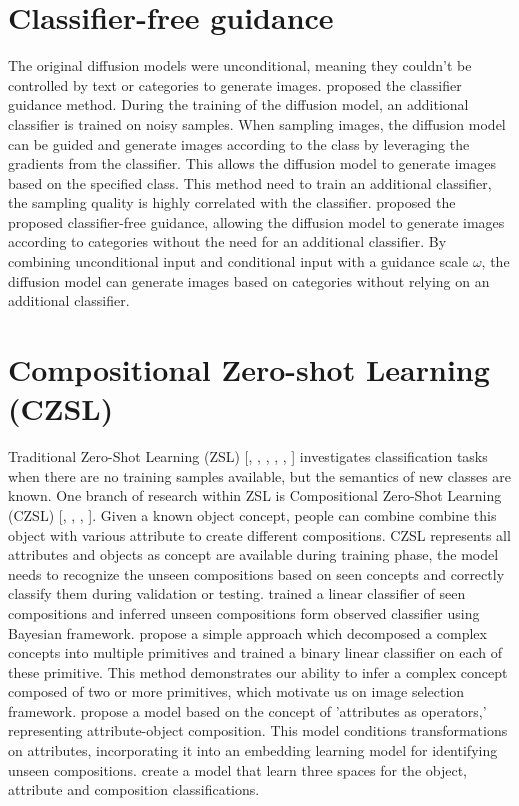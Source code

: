 \section{Classifier-free guidance}
The original diffusion models were unconditional, meaning they couldn't be controlled by text or categories to generate images.\cite{dhariwal2021diffusion} proposed the classifier guidance method. During the training of the diffusion model, an additional classifier is trained on noisy samples. When sampling images, the diffusion model can be guided and generate images according to the class by leveraging the gradients from the classifier. This allows the diffusion model to generate images based on the specified class. This method need to train an additional classifier, the sampling quality is highly correlated with the classifier. \cite{ho2022classifier} proposed the proposed classifier-free guidance, allowing the diffusion model to generate images according to categories without the need for an additional classifier. By combining unconditional input and conditional input with a guidance scale $\omega$, the diffusion model can generate images based on categories without relying on an additional classifier.


\section{Compositional Zero-shot Learning (CZSL)}
Traditional Zero-Shot Learning (ZSL) [\cite{wang2019survey}, \cite{pourpanah2022review}, \cite{xian2018zero}, \cite{rahman2018unified}, \cite{xian2018feature}, \cite{han2021contrastive}] investigates classification tasks when there are no training samples available, but the semantics of new classes are known. One branch of research within ZSL is Compositional Zero-Shot Learning (CZSL) [\cite{xu2021zero}, \cite{yang2022decomposable}, \cite{lu2023decomposed}, \cite{saini2022disentangling}]. Given a known object concept, people can combine combine this object with various attribute to create different compositions. CZSL represents all attributes and objects as concept are available during training phase, the model needs to recognize the unseen compositions based on seen concepts and correctly classify them during validation or testing. \cite{chen2014inferring} trained a linear classifier of seen compositions and inferred unseen compositions form observed classifier using Bayesian framework. \cite{misra2017red} propose a simple approach which decomposed a complex concepts into multiple primitives and trained a binary linear classifier on each of these primitive. This method demonstrates our ability to infer a complex concept composed of two or more primitives, which motivate us on image selection framework. \cite{nagarajan2018attributes} propose a model based on the  concept of 'attributes as operators,' representing attribute-object composition. This model conditions transformations on attributes, incorporating it into an embedding learning model for identifying unseen compositions. \cite{yang2022decomposable} create a model that learn three spaces for the object, attribute and composition classifications.



